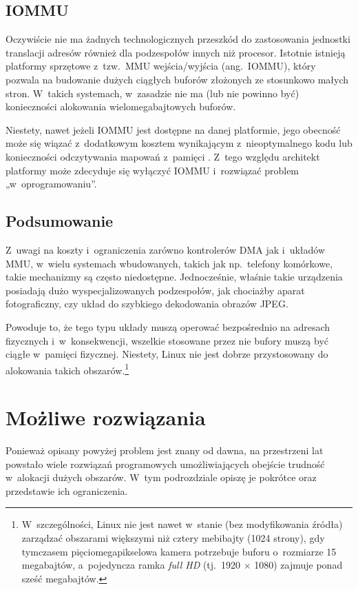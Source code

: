 \subsection{IOMMU}

Oczywiście nie ma żadnych technologicznych przeszkód do zastosowania
jednostki translacji adresów również dla podzespołów innych niż
procesor.  Istotnie istnieją platformy sprzętowe z~tzw.\ MMU
wejścia/wyjścia (ang.\ IOMMU), który pozwala na budowanie dużych
ciągłych buforów złożonych ze stosunkowo małych stron.  W~takich
systemach, w~zasadzie nie ma (lub nie powinno być) konieczności
alokowania wielomegabajtowych buforów.

Niestety, nawet jeżeli IOMMU jest dostępne na danej platformie, jego
obecność może się wiązać z~dodatkowym kosztem wynikającym
z~nieoptymalnego kodu \autocite{bib:price-of-safety} lub konieczności
odczytywania mapowań z~pamięci
\autocite{bib:mitigate-iotlb-bottleneck}.  Z~tego względu architekt
platformy może zdecyduje się wyłączyć IOMMU i~rozwiązać problem
„w~oprogramowaniu”.

\subsection{Podsumowanie}

Z~uwagi na koszty i~ograniczenia zarówno kontrolerów DMA jak i~układów
MMU, w~wielu systemach wbudowanych, takich jak np.\ telefony
komórkowe, takie mechanizmy są często niedostępne.  Jednocześnie,
właśnie takie urządzenia posiadają dużo wyspecjalizowanych
podzespołów, jak chociażby aparat fotograficzny, czy układ do
szybkiego dekodowania obrazów JPEG.

Powoduje to, że tego typu układy muszą operować bezpośrednio na
adresach fizycznych i~w~konsekwencji, wszelkie stosowane przez nie
bufory muszą być ciągłe w~pamięci fizycznej.  Niestety, Linux nie jest
dobrze przystosowany do alokowania takich
obszarów.\footnote{W~szczególności, Linux nie jest nawet w~stanie (bez
  modyfikowania źródła) zarządzać obszarami większymi niż cztery
  mebibajty (1024 strony), gdy tymczasem pięciomegapikselowa kamera
  potrzebuje buforu o~rozmiarze 15 megabajtów, a~pojedyncza ramka
  \textit{full HD} (tj.\ 1920 $\times$ 1080) zajmuje ponad sześć
  megabajtów.}


\section{Możliwe rozwiązania}

Ponieważ opisany powyżej problem jest znany od dawna, na przestrzeni
lat powstało wiele rozwiązań programowych umożliwiających obejście
trudność w~alokacji dużych obszarów.  W~tym podrozdziale opiszę je
pokrótce oraz przedstawie ich ograniczenia.

